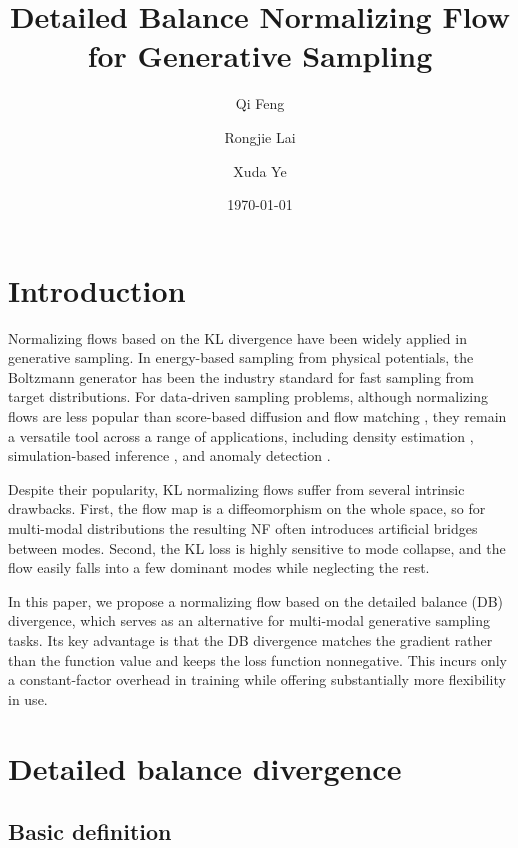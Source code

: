 \documentclass{article}
\title{Detailed Balance Normalizing Flow for Generative Sampling}
\author[1]{Qi Feng}
\author[2]{Rongjie Lai}
\author[2]{Xuda Ye}
\affil[1]{Department of Mathematics, Florida State University, Tallahassee, FL 32306}
\affil[2]{Department of Mathematics, Purdue University, West Lafayette, IN 47907}
\date{\today}
\theoremstyle{plain}
\begin{document}
\maketitle

\section{Introduction}

Normalizing flows based on the KL divergence \citep{rezende2015variational} have been widely applied in generative sampling. In energy-based sampling from physical potentials, the Boltzmann generator \citep{noe2019boltzmann,wu2020stochastic} has been the industry standard for fast sampling from target distributions. For data-driven sampling problems, although normalizing flows are less popular than score-based diffusion \citep{ho2020denoising,song2021score} and flow matching \citep{lipman2023flow}, they remain a versatile tool across a range of applications, including density estimation \citep{papamakarios2017masked,kingma2018glow}, simulation-based inference \citep{papamakarios2019sequential}, and anomaly detection \citep{kirichenko2020normalizing,rudolph2021same}.

Despite their popularity, KL normalizing flows suffer from several intrinsic drawbacks. First, the flow map is a diffeomorphism on the whole space, so for multi-modal distributions the resulting NF often introduces artificial bridges between modes. Second, the KL loss is highly sensitive to mode collapse, and the flow easily falls into a few dominant modes while neglecting the rest.

In this paper, we propose a normalizing flow based on the detailed balance (DB) divergence, which serves as an alternative for multi-modal generative sampling tasks. Its key advantage is that the DB divergence matches the gradient rather than the function value and keeps the loss function nonnegative. This incurs only a constant-factor overhead in training while offering substantially more flexibility in use.

\section{Detailed balance divergence}

\subsection{Basic definition}
\end{document}
